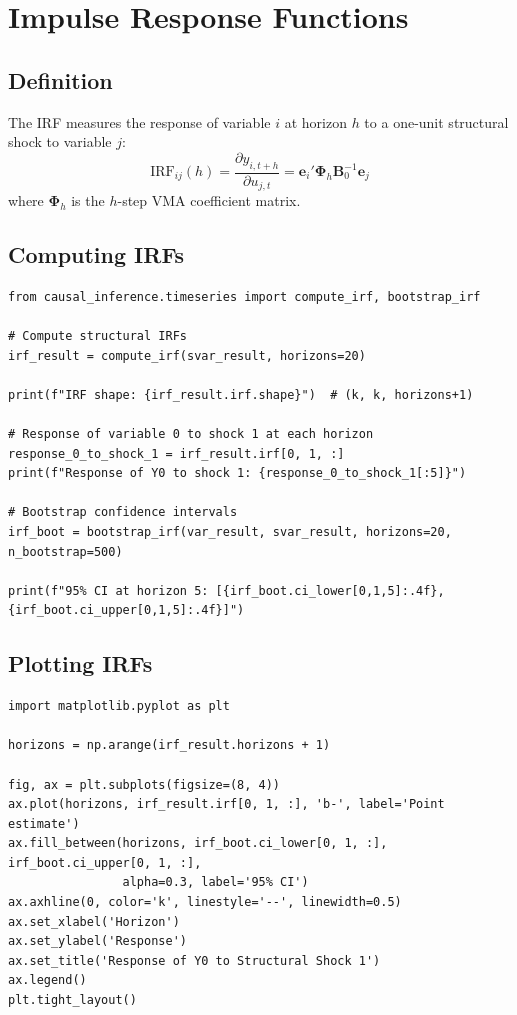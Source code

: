 \section{Impulse Response Functions}

\subsection{Definition}

\begin{definition}
The IRF measures the response of variable $i$ at horizon $h$ to a one-unit structural shock to variable $j$:
\begin{equation}
\text{IRF}_{ij}(h) = \frac{\partial y_{i,t+h}}{\partial u_{j,t}} = \mathbf{e}_i' \boldsymbol{\Phi}_h \mathbf{B}_0^{-1} \mathbf{e}_j
\end{equation}
where $\boldsymbol{\Phi}_h$ is the $h$-step VMA coefficient matrix.
\end{definition}

\subsection{Computing IRFs}

\begin{verbatim}
from causal_inference.timeseries import compute_irf, bootstrap_irf

# Compute structural IRFs
irf_result = compute_irf(svar_result, horizons=20)

print(f"IRF shape: {irf_result.irf.shape}")  # (k, k, horizons+1)

# Response of variable 0 to shock 1 at each horizon
response_0_to_shock_1 = irf_result.irf[0, 1, :]
print(f"Response of Y0 to shock 1: {response_0_to_shock_1[:5]}")

# Bootstrap confidence intervals
irf_boot = bootstrap_irf(var_result, svar_result, horizons=20, n_bootstrap=500)

print(f"95% CI at horizon 5: [{irf_boot.ci_lower[0,1,5]:.4f}, {irf_boot.ci_upper[0,1,5]:.4f}]")
\end{verbatim}

\subsection{Plotting IRFs}

\begin{verbatim}
import matplotlib.pyplot as plt

horizons = np.arange(irf_result.horizons + 1)

fig, ax = plt.subplots(figsize=(8, 4))
ax.plot(horizons, irf_result.irf[0, 1, :], 'b-', label='Point estimate')
ax.fill_between(horizons, irf_boot.ci_lower[0, 1, :], irf_boot.ci_upper[0, 1, :],
                alpha=0.3, label='95% CI')
ax.axhline(0, color='k', linestyle='--', linewidth=0.5)
ax.set_xlabel('Horizon')
ax.set_ylabel('Response')
ax.set_title('Response of Y0 to Structural Shock 1')
ax.legend()
plt.tight_layout()
\end{verbatim}


